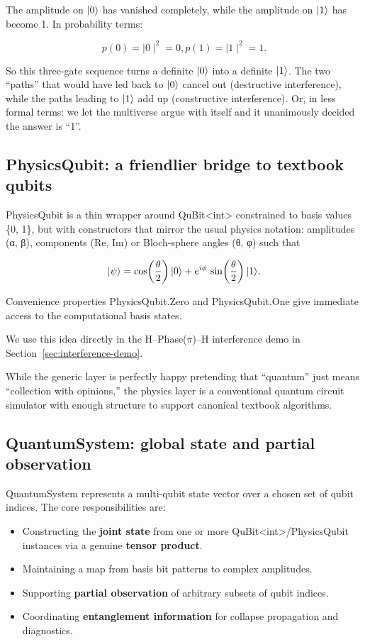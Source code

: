 \documentclass[a4paper,11pt]{article}
\begin{document}
The amplitude on \(\lvert 0 \rangle\) has vanished completely, while the amplitude on \(\lvert 1 \rangle\) has become 1. In probability terms:

\[p(0) = \mid 0 \mid^{2} = 0,p(1) = \mid 1 \mid^{2} = 1.\]

So this three-gate sequence turns a definite \(\lvert 0 \rangle\) into a definite \(\lvert 1 \rangle\). The two ``paths'' that would have led back to \(\lvert 0 \rangle\) cancel out (destructive interference), while the paths leading to \(\lvert 1 \rangle\) add up (constructive interference). Or, in less formal terms: we let the multiverse argue with itself and it unanimously decided the answer is ``1''.

\subsection{PhysicsQubit: a friendlier bridge to textbook qubits}

PhysicsQubit is a thin wrapper around QuBit\textless int\textgreater{} constrained to basis values \{0, 1\}, but with constructors that mirror the usual physics notation: amplitudes (α, β), components (Re, Im) or Bloch-sphere angles (θ, φ) such that

\[
\lvert \psi \rangle
= \cos\!\left(\frac{\theta}{2}\right)\lvert 0 \rangle
+ e^{i\phi}\,\sin\!\left(\frac{\theta}{2}\right)\lvert 1 \rangle.
\]

Convenience properties PhysicsQubit.Zero and PhysicsQubit.One give immediate access to the computational basis states.

We use this idea directly in the H--Phase($\pi$)--H interference demo in Section~\ref{sec:interference-demo}.

While the generic layer is perfectly happy pretending that ``quantum'' just means ``collection with opinions,'' the physics layer is a conventional quantum circuit simulator with enough structure to support canonical textbook algorithms.

\subsection{QuantumSystem: global state and partial observation}
QuantumSystem represents a multi-qubit state vector over a chosen set of qubit indices. The core responsibilities are: 

\begin{itemize}
\item
  Constructing the \textbf{joint state} from one or more QuBit\textless int\textgreater/PhysicsQubit instances via a genuine \textbf{tensor product}.
\item
  Maintaining a map from basis bit patterns to complex amplitudes.
\item
  Supporting \textbf{partial observation} of arbitrary subsets of qubit indices.
\item
  Coordinating \textbf{entanglement information} for collapse propagation and diagnostics.
\end{itemize}
\end{document}
